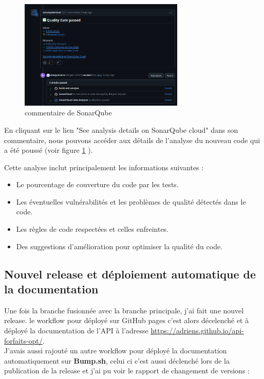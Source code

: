 \documentclass{article}
\begin{document}
		\begin{figure}[H] \centering \includegraphics[width=0.7\textwidth]{asset/sonarq_com.png} \caption{commentaire de SonarQube} \label{fig:sonarq}\end{figure}
	
	En cliquant sur le lien "See analysis details on SonarQube cloud" dans son commentaire, nous pouvons accéder aux détails de l'analyse du nouveau code qui a été poussé (voir figure \ref{fig:sonarq} ). 
	
	Cette analyse inclut principalement les informations suivantes : \begin{itemize} \item Le pourcentage de couverture du code par les tests. \item Les éventuelles vulnérabilités et les problèmes de qualité détectés dans le code. \item Les règles de code respectées et celles enfreintes. \item Des suggestions d'amélioration pour optimiser la qualité du code. \end{itemize}
	
	\subsection{Nouvel release et déploiement automatique de la documentation}
	
	Une fois la branche fusionnée avec la branche principale, j'ai fait une nouvel release. le workflow pour déployé sur GitHub pages c'est alors décelenché et à déployé la documentation de l'API à l'adresse \url{https://adriens.github.io/api-forfaits-opt/}.\\
	J'avais aussi rajouté un autre workflow pour déployé la documentation  automatiquement sur \textbf{Bump.sh}, celui ci c'est aussi déclenché lors de la publication de la release et j'ai pu voir le rapport de changement de versions : 
	
\end{document}
